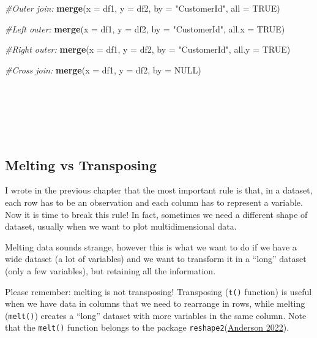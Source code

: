 \documentclass[
]{article}
\newenvironment{Shaded}{\begin{snugshade}}{\end{snugshade}}
\newcommand{\AttributeTok}[1]{\textcolor[rgb]{0.13,0.29,0.53}{#1}}
\newcommand{\CommentTok}[1]{\textcolor[rgb]{0.56,0.35,0.01}{\textit{#1}}}
\newcommand{\ConstantTok}[1]{\textcolor[rgb]{0.56,0.35,0.01}{#1}}
\newcommand{\FunctionTok}[1]{\textcolor[rgb]{0.13,0.29,0.53}{\textbf{#1}}}
\newcommand{\NormalTok}[1]{#1}
\newcommand{\StringTok}[1]{\textcolor[rgb]{0.31,0.60,0.02}{#1}}
\begin{document}
\begin{Shaded}
\begin{Highlighting}[]
\CommentTok{\#Outer join: }
\FunctionTok{merge}\NormalTok{(}\AttributeTok{x =}\NormalTok{ df1, }\AttributeTok{y =}\NormalTok{ df2, }\AttributeTok{by =} \StringTok{"CustomerId"}\NormalTok{, }\AttributeTok{all =} \ConstantTok{TRUE}\NormalTok{)}

\CommentTok{\#Left outer: }
\FunctionTok{merge}\NormalTok{(}\AttributeTok{x =}\NormalTok{ df1, }\AttributeTok{y =}\NormalTok{ df2, }\AttributeTok{by =} \StringTok{"CustomerId"}\NormalTok{, }\AttributeTok{all.x =} \ConstantTok{TRUE}\NormalTok{)}

\CommentTok{\#Right outer: }
\FunctionTok{merge}\NormalTok{(}\AttributeTok{x =}\NormalTok{ df1, }\AttributeTok{y =}\NormalTok{ df2, }\AttributeTok{by =} \StringTok{"CustomerId"}\NormalTok{, }\AttributeTok{all.y =} \ConstantTok{TRUE}\NormalTok{)}

\CommentTok{\#Cross join: }
\FunctionTok{merge}\NormalTok{(}\AttributeTok{x =}\NormalTok{ df1, }\AttributeTok{y =}\NormalTok{ df2, }\AttributeTok{by =} \ConstantTok{NULL}\NormalTok{)}
\end{Highlighting}
\end{Shaded}

~

~

~

\hypertarget{melting-vs-transposing}{%
\subsection{Melting vs Transposing}\label{melting-vs-transposing}}

I wrote in the previous chapter that the most important rule is that, in
a dataset, each row has to be an observation and each column has to
represent a variable. Now it is time to break this rule! In fact,
sometimes we need a different shape of dataset, usually when we want to
plot multidimensional data.

Melting data sounds strange, however this is what we want to do if we
have a wide dataset (a lot of variables) and we want to transform it in
a ``long'' dataset (only a few variables), but retaining all the
information.

Please remember: melting is not transposing! Transposing (\texttt{t()}
function) is useful when we have data in columns that we need to
rearrange in rows, while melting (\texttt{melt()}) creates a ``long'' dataset
with more variables in the same column. Note that the \texttt{melt()} function
belongs to the package \texttt{reshape2}(\protect\hyperlink{ref-anderson2022}{Anderson 2022}).
\end{document}
